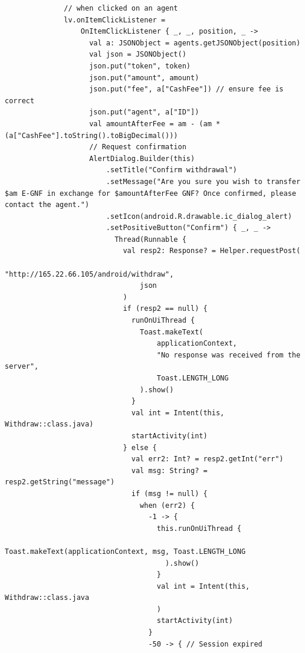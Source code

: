 \documentclass[11pt, a4paper]{article}
\begin{document}
\begin{appendices}
\begin{lstlisting}
              // when clicked on an agent
              lv.onItemClickListener =
                  OnItemClickListener { _, _, position, _ ->
                    val a: JSONObject = agents.getJSONObject(position)
                    val json = JSONObject()
                    json.put("token", token)
                    json.put("amount", amount)
                    json.put("fee", a["CashFee"]) // ensure fee is correct
                    json.put("agent", a["ID"])
                    val amountAfterFee = am - (am * (a["CashFee"].toString().toBigDecimal()))
                    // Request confirmation
                    AlertDialog.Builder(this)
                        .setTitle("Confirm withdrawal")
                        .setMessage("Are you sure you wish to transfer $am E-GNF in exchange for $amountAfterFee GNF? Once confirmed, please contact the agent.")
                        .setIcon(android.R.drawable.ic_dialog_alert)
                        .setPositiveButton("Confirm") { _, _ ->
                          Thread(Runnable {
                            val resp2: Response? = Helper.requestPost(
                                "http://165.22.66.105/android/withdraw",
                                json
                            )
                            if (resp2 == null) {
                              runOnUiThread {
                                Toast.makeText(
                                    applicationContext,
                                    "No response was received from the server",
                                    Toast.LENGTH_LONG
                                ).show()
                              }
                              val int = Intent(this, Withdraw::class.java)
                              startActivity(int)
                            } else {
                              val err2: Int? = resp2.getInt("err")
                              val msg: String? = resp2.getString("message")
                              if (msg != null) {
                                when (err2) {
                                  -1 -> {
                                    this.runOnUiThread {
                                      Toast.makeText(applicationContext, msg, Toast.LENGTH_LONG
                                      ).show()
                                    }
                                    val int = Intent(this, Withdraw::class.java
                                    )
                                    startActivity(int)
                                  }
                                  -50 -> { // Session expired

\end{lstlisting}
\end{appendices}
\end{document}

